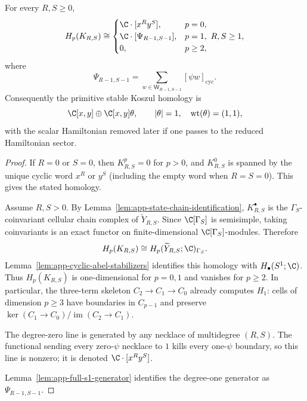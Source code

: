 \begin{thm}
\label{thm:app-full-primitive-psi-homology}
  For every \(R,S\geq0\),
  \[
    H_p(K_{R,S})\cong
    \begin{cases}
      \C\cdot[x^Ry^S],&p=0,\\
      \C\cdot[\Psi_{R-1,S-1}],&p=1,\ R,S\geq1,\\
      0,&p\geq2,
    \end{cases}
  \]
  where
  \[
    \Psi_{R-1,S-1}
      =
      \sum_{w\in\mathsf W_{R-1,S-1}}[\psi w]_{\mathrm{cyc}} .
  \]
  Consequently the primitive stable Koszul homology is
  \[
    \C[x,y]\oplus\C[x,y]\theta,\qquad
    |\theta|=1,\quad \operatorname{wt}(\theta)=(1,1),
  \]
  with the scalar Hamiltonian removed later if one passes to the reduced
  Hamiltonian sector.
\end{thm}

\begin{proof}
  If \(R=0\) or \(S=0\), then \(K^p_{R,S}=0\) for \(p>0\), and
  \(K^0_{R,S}\) is spanned by the unique cyclic word \(x^R\) or \(y^S\)
  (including the empty word when \(R=S=0\)).  This gives the stated homology.

  Assume \(R,S>0\).  By Lemma~\ref{lem:app-state-chain-identification},
  \(K^\bullet_{R,S}\) is the \(\Gamma_S\)-coinvariant cellular chain complex of
  \(\widetilde Y_{R,S}\).  Since \(\C[\Gamma_S]\) is semisimple, taking
  coinvariants is an exact functor on finite-dimensional \(\C[\Gamma_S]\)-modules.
  Therefore
  \[
    H_p(K_{R,S})
      \cong H_p(\widetilde Y_{R,S};\C)_{\Gamma_S}.
  \]
  Lemma~\ref{lem:app-cyclic-abel-stabilizers} identifies this homology
  with \(H_\bullet(S^1;\C)\).  Thus \(H_p(K_{R,S})\) is one-dimensional
  for \(p=0,1\) and vanishes for \(p\geq2\).
  In particular, the three-term skeleton
  \(C_2\to C_1\to C_0\) already computes \(H_1\): cells of dimension
  \(p\ge3\) have boundaries in \(C_{p-1}\) and preserve
  \(\ker(C_1\to C_0)/\operatorname{im}(C_2\to C_1)\).

  The degree-zero line is generated by any necklace of multidegree \((R,S)\).
  The functional sending every zero-\(\psi\) necklace to \(1\) kills every
  one-\(\psi\) boundary, so this line is nonzero; it is denoted
  \(\C\cdot[x^Ry^S]\).

  Lemma~\ref{lem:app-full-s1-generator} identifies the degree-one
  generator as \(\Psi_{R-1,S-1}\).
\end{proof}

